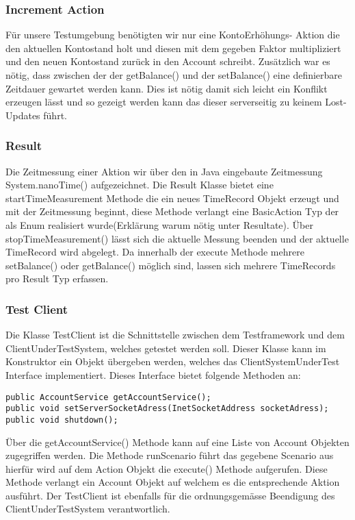 \subsubsection{Increment Action}
\label{sec:incrementAction}
Für unsere Testumgebung benötigten wir nur eine KontoErhöhungs- Aktion die den aktuellen Kontostand holt und diesen mit dem gegeben Faktor multipliziert und den neuen Kontostand zurück in den Account schreibt. Zusätzlich war es nötig, dass zwischen der der getBalance() und der setBalance() eine definierbare Zeitdauer gewartet werden kann. Dies ist nötig damit sich leicht ein Konflikt erzeugen lässt und so gezeigt werden kann das  dieser serverseitig zu keinem Lost-Updates führt.

\subsubsection{Result}
\label{sec:result}
Die Zeitmessung einer Aktion wir über den in Java eingebaute Zeitmessung System.nanoTime() aufgezeichnet. Die Result Klasse bietet eine startTimeMeasurement Methode die ein neues TimeRecord Objekt erzeugt und mit der Zeitmessung beginnt, diese Methode verlangt eine BasicAction Typ der als Enum realisiert wurde(Erklärung warum nötig unter Resultate). Über stopTimeMeasurement() lässt sich die aktuelle Messung beenden und der aktuelle TimeRecord wird abgelegt. Da innerhalb der execute Methode mehrere setBalance() oder getBalance() möglich sind, lassen sich mehrere TimeRecords pro Result Typ erfassen.


\subsubsection{Test Client}
\label{sec:testclient}
Die Klasse TestClient ist die Schnittstelle zwischen dem Testframework und dem ClientUnderTestSystem, welches getestet werden soll. Dieser Klasse kann im Konstruktor ein Objekt übergeben werden, welches das ClientSystemUnderTest Interface implementiert. Dieses Interface bietet folgende Methoden an:
\begin{lstlisting}
public AccountService getAccountService();
public void setServerSocketAdress(InetSocketAddress socketAdress);
public void shutdown();
\end{lstlisting}	
Über die getAccountService() Methode kann auf eine Liste von Account Objekten zugegriffen werden. Die Methode runScenario führt das gegebene Scenario aus hierfür wird auf dem Action Objekt die execute() Methode aufgerufen. Diese Methode verlangt ein Account Objekt auf welchem es die entsprechende Aktion ausführt. Der TestClient ist ebenfalls für die ordnungsgemässe Beendigung des ClientUnderTestSystem verantwortlich.


